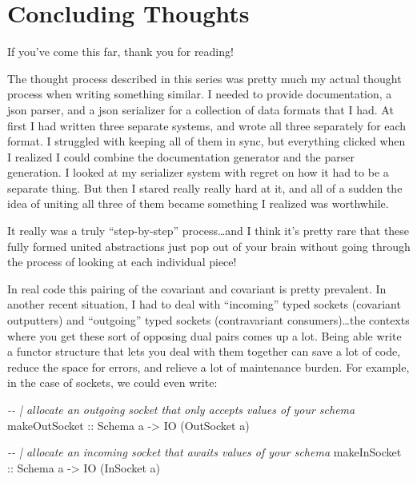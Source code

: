 \documentclass[]{article}
\newenvironment{Shaded}{}{}
\newcommand{\CommentTok}[1]{\textcolor[rgb]{0.38,0.63,0.69}{\textit{#1}}}
\newcommand{\DataTypeTok}[1]{\textcolor[rgb]{0.56,0.13,0.00}{#1}}
\newcommand{\NormalTok}[1]{#1}
\newcommand{\OtherTok}[1]{\textcolor[rgb]{0.00,0.44,0.13}{#1}}
\begin{document}
\hypertarget{concluding-thoughts}{%
\section{Concluding Thoughts}\label{concluding-thoughts}}

If you've come this far, thank you for reading!

The thought process described in this series was pretty much my actual thought
process when writing something similar. I needed to provide documentation, a
json parser, and a json serializer for a collection of data formats that I had.
At first I had written three separate systems, and wrote all three separately
for each format. I struggled with keeping all of them in sync, but everything
clicked when I realized I could combine the documentation generator and the
parser generation. I looked at my serializer system with regret on how it had to
be a separate thing. But then I stared really really hard at it, and all of a
sudden the idea of uniting all three of them became something I realized was
worthwhile.

It really was a truly ``step-by-step'' process\ldots and I think it's pretty
rare that these fully formed united abstractions just pop out of your brain
without going through the process of looking at each individual piece!

In real code this pairing of the covariant and covariant is pretty prevalent. In
another recent situation, I had to deal with ``incoming'' typed sockets
(covariant outputters) and ``outgoing'' typed sockets (contravariant
consumers)\ldots the contexts where you get these sort of opposing dual pairs
comes up a lot. Being able write a functor structure that lets you deal with
them together can save a lot of code, reduce the space for errors, and relieve a
lot of maintenance burden. For example, in the case of sockets, we could even
write:

\begin{Shaded}
\begin{Highlighting}[]
\CommentTok{{-}{-} | allocate an outgoing socket that only accepts values of your schema}
\OtherTok{makeOutSocket ::} \DataTypeTok{Schema}\NormalTok{ a }\OtherTok{{-}>} \DataTypeTok{IO}\NormalTok{ (}\DataTypeTok{OutSocket}\NormalTok{ a)}

\CommentTok{{-}{-} | allocate an incoming socket that awaits values of your schema}
\OtherTok{makeInSocket ::} \DataTypeTok{Schema}\NormalTok{ a }\OtherTok{{-}>} \DataTypeTok{IO}\NormalTok{ (}\DataTypeTok{InSocket}\NormalTok{ a)}
\end{Highlighting}
\end{Shaded}
\end{document}
